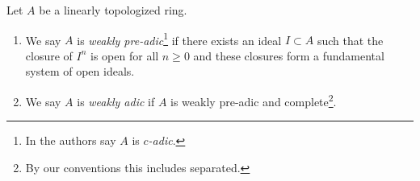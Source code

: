 \begin{definition}
\label{definition-weakly-adic}
\begin{reference}
\cite[Definition 8.3.8]{Gabber-Ramero}
\end{reference}
Let $A$ be a linearly topologized ring.
\begin{enumerate}
\item We say $A$ is {\it weakly pre-adic}\footnote{In \cite{Gabber-Ramero} the
authors say $A$ is {\it $c$-adic}.} if there exists an ideal
$I \subset A$ such that the closure of $I^n$ is open for all $n \geq 0$
and these closures form a fundamental system of open ideals.
\item We say $A$ is {\it weakly adic} if $A$ is weakly pre-adic
and complete\footnote{By our conventions this includes separated.}.
\end{enumerate}
\end{definition}